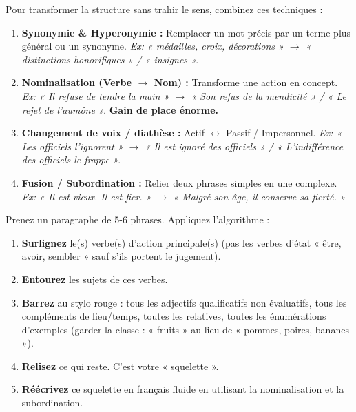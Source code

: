 \documentclass[11pt]{article}
\begin{document}
\begin{propriete}
Pour transformer la structure sans trahir le sens, combinez ces techniques :
\begin{enumerate}
    \item \textbf{Synonymie \& Hyperonymie :} Remplacer un mot précis par un terme plus général ou un synonyme. \textit{Ex: « médailles, croix, décorations » $\rightarrow$ « distinctions honorifiques » / « insignes ».}
    \item \textbf{Nominalisation (Verbe $\rightarrow$ Nom) :} Transforme une action en concept. \textit{Ex: « Il refuse de tendre la main » $\rightarrow$ « Son refus de la mendicité » / « Le rejet de l'aumône ».} \textbf{Gain de place énorme.}
    \item \textbf{Changement de voix / diathèse :} Actif $\leftrightarrow$ Passif / Impersonnel. \textit{Ex: « Les officiels l'ignorent » $\rightarrow$ « Il est ignoré des officiels » / « L'indifférence des officiels le frappe ».}
    \item \textbf{Fusion / Subordination :} Relier deux phrases simples en une complexe. \textit{Ex: « Il est vieux. Il est fier. » $\rightarrow$ « Malgré son âge, il conserve sa fierté. »}
\end{enumerate}
\end{propriete}

\begin{methode}
Prenez un paragraphe de 5-6 phrases. Appliquez l'algorithme :
\begin{enumerate}
    \item \textbf{Surlignez} le(s) verbe(s) d'action principale(s) (pas les verbes d'état « être, avoir, sembler » sauf s'ils portent le jugement).
    \item \textbf{Entourez} les sujets de ces verbes.
    \item \textbf{Barrez} au stylo rouge : tous les adjectifs qualificatifs non évaluatifs, tous les compléments de lieu/temps, toutes les relatives, toutes les énumérations d'exemples (garder la classe : « fruits » au lieu de « pommes, poires, bananes »).
    \item \textbf{Relisez} ce qui reste. C'est votre « squelette ».
    \item \textbf{Réécrivez} ce squelette en français fluide en utilisant la nominalisation et la subordination.
\end{enumerate}
\end{methode}
\end{document}
